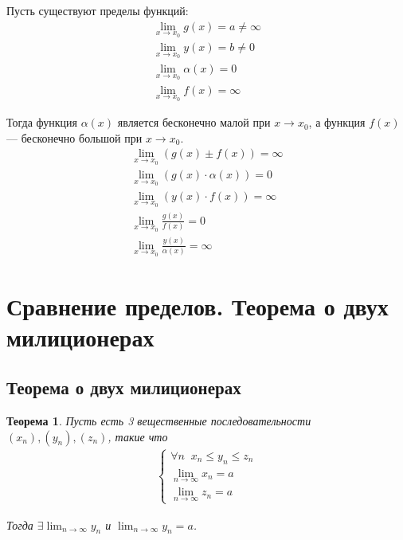 \documentclass[a4paper,12pt]{extbook}
\theoremstyle{numbered}
\theoremstyle{named}
\newtheorem*{theorem}{Теорема}
\theoremstyle{named}
\theoremstyle{named}
\begin{document}
Пусть существуют пределы функций:
\begin{gather*}
    \lim_{x \to x_0}{g(x)} = a \neq \infty \\
    \lim_{x \to x_0}{y(x)} = b \neq 0 \\
    \lim_{x \to x_0}{\alpha(x)} = 0 \\
    \lim_{x \to x_0}{f(x)} = \infty
\end{gather*}

Тогда функция \(\alpha(x)\) является бесконечно малой при \(x \to x_0\), а функция \(f(x)\) — бесконечно большой при \(x \to x_0\).
\begin{gather*}
    \lim_{x \to x_0}{(g(x) \pm f(x))} = \infty \\
    \lim_{x \to x_0}{(g(x) \cdot \alpha(x))} = 0 \\
    \lim_{x \to x_0}{(y(x) \cdot f(x))} = \infty \\
    \lim_{x \to x_0}{\frac{g(x)}{f(x)}} = 0 \\
    \lim_{x \to x_0}{\frac{y(x)}{\alpha(x)}} = \infty
\end{gather*}

\section{Сравнение пределов. Теорема о двух милиционерах}%
\label{sec:Сравнение пределов. Теорема о двух милиционерах}

\subsection*{Теорема о двух милиционерах}%
\label{sub:Теорема о двух милиционерах}
\begin{theorem}
    Пусть есть 3 вещественные последовательности \((x_n), (y_n), (z_n)\), такие что
    \begin{gather*}
        \begin{cases}
            \forall n \;\; x_n \leq y_n \leq z_n        \\
            \displaystyle{\lim_{n \to \infty}{x_n}} = a \\
            \displaystyle{\lim_{n \to \infty}{z_n}} = a
        \end{cases}
    \end{gather*}

    Тогда \(\exists \displaystyle{\lim_{n \to \infty}{y_n}}\) и  \(\displaystyle{\lim_{n \to \infty}{y_n}} = a\).
\end{theorem}
\end{document}
